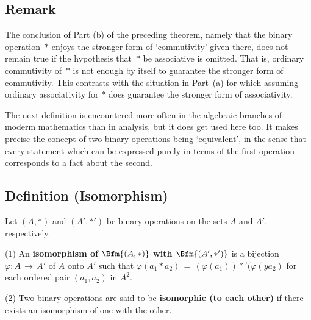 {\V

            \subsection{\small{\bf Remark}}
            \label{RemrkA60.60}

        The conclusion of Part (b) of the preceding theorem, namely that the binary operation~${\ast}$ enjoys the stronger form of `commutivity' given there,
    does not remain true if the hypothesis that~${\ast}$ be associative is omitted.
    That is, ordinary commutivity of~${\ast}$ is not enough by itself to guarantee the stronger form of commutivity.
    This contrasts with the situation in Part~(a) for which assuming ordinary associativity for ${\ast}$ does guarantee the stronger form of associativity.


\VV

        The next definition is encountered more often in the algebraic branches of moderm mathematics than in analysis, but it does get used here too.
    It makes precise the concept of two binary operations being `equivalent', in the sense that
    every statement which can be expressed purely in terms of the first operation corresponds to a fact about the second.

\V

            \subsection{\small{\bf Definition} (Isomorphism)}
            \label{DefA60.70}

\V

        Let $(A,{\ast})$ and $(A',{\ast}')$ be binary operations on the sets $A$ and $A'$, respectively.

\V

        (1) An {\bf isomorphism of $\Bfm{(A,{\ast})}$
    with $\Bfm{(A',{\ast}')}$} is a bijection ${\varphi}:A \,{\rightarrow}\, A'$ of $A$ onto $A'$ such that
    ${\varphi}(a_{1}{\ast}a_{2}) \,=\, ({\varphi}(a_{1})){\ast}'({\varphi}(ya_{2})$
    for each ordered pair $(a_{1},a_{2})$ in $A^{2}$.

\V

        (2) Two binary operations are said to be {\bf isomorphic (to each other)} if there exists an isomorphism of one with the other.

}
